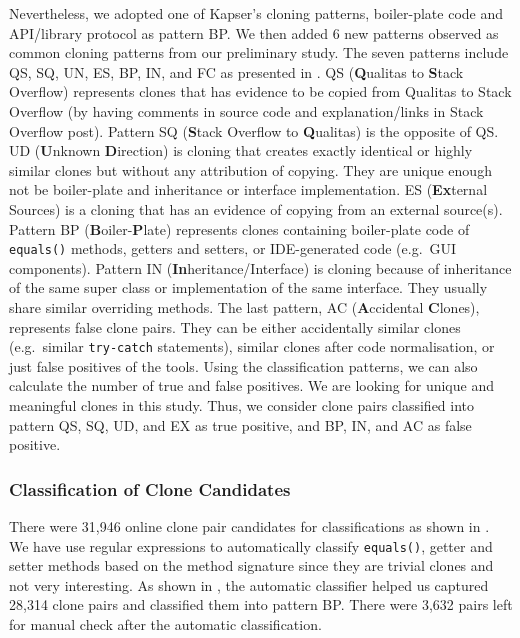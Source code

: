 \documentclass[sigconf,review, anonymous]{acmart}
\begin{document}
Nevertheless, we adopted one of Kapser's cloning patterns, boiler-plate code and API/library protocol as pattern BP. We then added 6 new patterns observed as common cloning patterns from our preliminary study. The seven patterns include QS, SQ, UN, ES, BP, IN, and FC as presented in . QS (\textbf{Q}ualitas to \textbf{S}tack Overflow) represents clones that has evidence to be copied from Qualitas to Stack Overflow (by having comments in source code and explanation/links in Stack Overflow post). Pattern SQ (\textbf{S}tack Overflow to \textbf{Q}ualitas) is the opposite of QS. UD (\textbf{U}nknown \textbf{D}irection) is cloning that creates exactly identical or highly similar clones but without any attribution of copying. They are unique enough not be boiler-plate and inheritance or interface implementation. ES (\textbf{Ex}ternal Sources) is a cloning that has an evidence of copying from an external source(s). Pattern BP (\textbf{B}oiler-\textbf{P}late) represents clones containing boiler-plate code of {\small\verb|equals()|} methods, getters and setters, or IDE-generated code (e.g.~GUI components). Pattern IN (\textbf{In}heritance/Interface) is cloning because of inheritance of the same super class or implementation of the same interface. They usually share similar overriding methods. The last pattern, AC (\textbf{A}ccidental \textbf{C}lones), represents false clone pairs. They can be either accidentally similar clones (e.g.~similar {\small\texttt{try-catch}} statements), similar clones after code normalisation, or just false positives of the tools. Using the classification patterns, we can also calculate the number of true and false positives. We are looking for unique and meaningful clones in this study. Thus, we consider clone pairs classified into pattern QS, SQ, UD, and EX as true positive, and BP, IN, and AC as false positive.

\subsubsection{Classification of Clone Candidates}

There were 31,946 online clone pair candidates for classifications as shown in . We have use regular expressions to automatically classify \texttt{equals()}, getter and setter methods  based on the method signature since they are trivial clones and not very interesting. As shown in , the automatic classifier helped us captured 28,314 clone pairs and classified them into pattern BP. There were 3,632 pairs left for manual check after the automatic classification.
\end{document}
